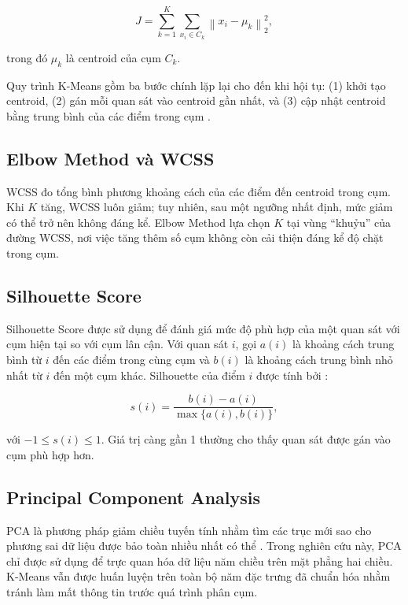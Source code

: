 \documentclass[11pt,a4paper]{article}
\begin{document}
\begin{equation}
J = \sum_{k=1}^{K} \sum_{x_i \in C_k} \left\|x_i - \mu_k\right\|_2^2,
\label{eq:kmeans}
\end{equation}

trong đó $\mu_k$ là centroid của cụm $C_k$.

Quy trình K-Means gồm ba bước chính lặp lại cho đến khi hội tụ: (1) khởi tạo centroid, (2) gán mỗi quan sát vào centroid gần nhất, và (3) cập nhật centroid bằng trung bình của các điểm trong cụm \cite{macqueen1967,lloyd1982}.

\subsection{Elbow Method và WCSS}

WCSS đo tổng bình phương khoảng cách của các điểm đến centroid trong cụm. Khi $K$ tăng, WCSS luôn giảm; tuy nhiên, sau một ngưỡng nhất định, mức giảm có thể trở nên không đáng kể. Elbow Method lựa chọn $K$ tại vùng ``khuỷu'' của đường WCSS, nơi việc tăng thêm số cụm không còn cải thiện đáng kể độ chặt trong cụm.

\subsection{Silhouette Score}

Silhouette Score được sử dụng để đánh giá mức độ phù hợp của một quan sát với cụm hiện tại so với cụm lân cận. Với quan sát $i$, gọi $a(i)$ là khoảng cách trung bình từ $i$ đến các điểm trong cùng cụm và $b(i)$ là khoảng cách trung bình nhỏ nhất từ $i$ đến một cụm khác. Silhouette của điểm $i$ được tính bởi \cite{rousseeuw1987}:

\begin{equation}
s(i) = \frac{b(i)-a(i)}{\max\{a(i),b(i)\}},
\label{eq:silhouette}
\end{equation}

với $-1 \leq s(i) \leq 1$. Giá trị càng gần 1 thường cho thấy quan sát được gán vào cụm phù hợp hơn.

\subsection{Principal Component Analysis}

PCA là phương pháp giảm chiều tuyến tính nhằm tìm các trục mới sao cho phương sai dữ liệu được bảo toàn nhiều nhất có thể \cite{pearson1901}. Trong nghiên cứu này, PCA chỉ được sử dụng để trực quan hóa dữ liệu năm chiều trên mặt phẳng hai chiều. K-Means vẫn được huấn luyện trên toàn bộ năm đặc trưng đã chuẩn hóa nhằm tránh làm mất thông tin trước quá trình phân cụm.
\end{document}

